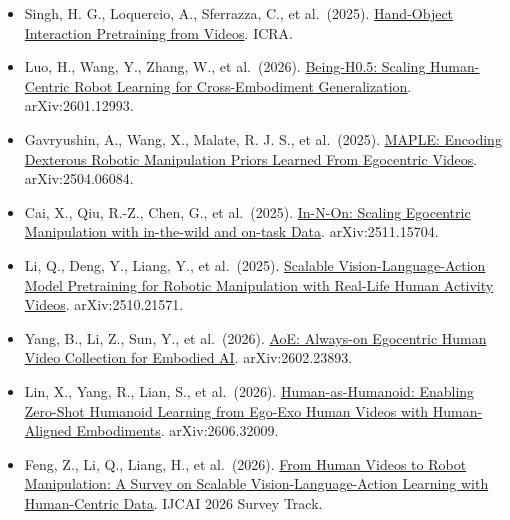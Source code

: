 \begin{itemize}
\item
  Singh, H. G., Loquercio, A., Sferrazza, C., et al.~(2025). \href{https://arxiv.org/abs/2409.08273}{Hand-Object Interaction Pretraining from Videos}. ICRA.
\item
  Luo, H., Wang, Y., Zhang, W., et al.~(2026). \href{https://arxiv.org/abs/2601.12993}{Being-H0.5: Scaling Human-Centric Robot Learning for Cross-Embodiment Generalization}. arXiv:2601.12993.
\item
  Gavryushin, A., Wang, X., Malate, R. J. S., et al.~(2025). \href{https://arxiv.org/abs/2504.06084}{MAPLE: Encoding Dexterous Robotic Manipulation Priors Learned From Egocentric Videos}. arXiv:2504.06084.
\item
  Cai, X., Qiu, R.-Z., Chen, G., et al.~(2025). \href{https://arxiv.org/abs/2511.15704}{In-N-On: Scaling Egocentric Manipulation with in-the-wild and on-task Data}. arXiv:2511.15704.
\item
  Li, Q., Deng, Y., Liang, Y., et al.~(2025). \href{https://arxiv.org/abs/2510.21571}{Scalable Vision-Language-Action Model Pretraining for Robotic Manipulation with Real-Life Human Activity Videos}. arXiv:2510.21571.
\item
  Yang, B., Li, Z., Sun, Y., et al.~(2026). \href{https://arxiv.org/abs/2602.23893}{AoE: Always-on Egocentric Human Video Collection for Embodied AI}. arXiv:2602.23893.
\item
  Lin, X., Yang, R., Lian, S., et al.~(2026). \href{https://arxiv.org/abs/2606.32009}{Human-as-Humanoid: Enabling Zero-Shot Humanoid Learning from Ego-Exo Human Videos with Human-Aligned Embodiments}. arXiv:2606.32009.
\item
  Feng, Z., Li, Q., Liang, H., et al.~(2026). \href{https://arxiv.org/abs/2606.00054}{From Human Videos to Robot Manipulation: A Survey on Scalable Vision-Language-Action Learning with Human-Centric Data}. IJCAI 2026 Survey Track.
\end{itemize}

\clearpage
